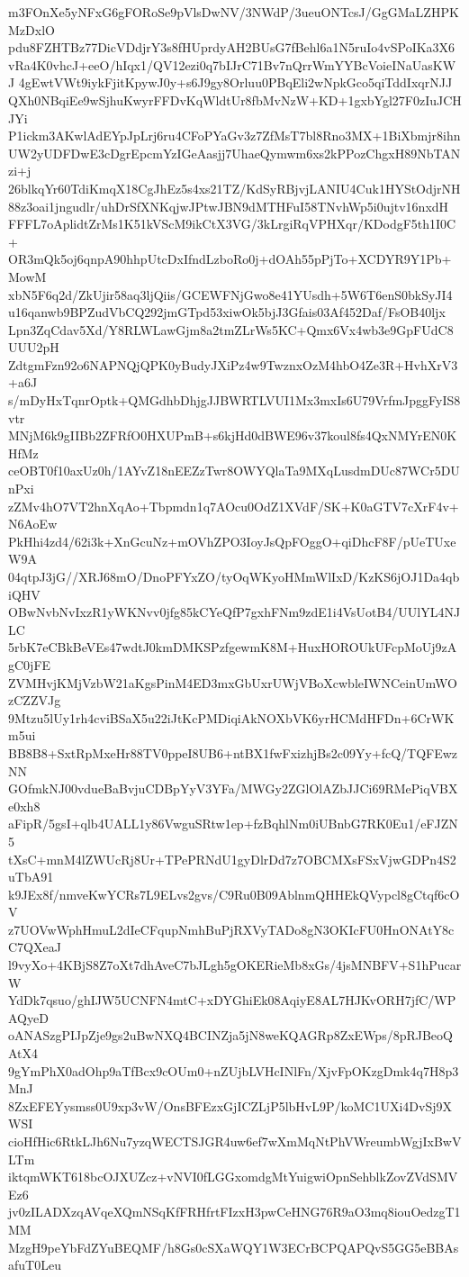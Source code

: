 m3FOnXe5yNFxG6gFORoSe9pVlsDwNV/3NWdP/3ueuONTcsJ/GgGMaLZHPKMzDxlO
pdu8FZHTBz77DicVDdjrY3s8fHUprdyAH2BUsG7fBehl6a1N5ruIo4vSPoIKa3X6
vRa4K0vhcJ+eeO/hIqx1/QV12ezi0q7bIJrC71Bv7nQrrWmYYBcVoieINaUasKWJ
4gEwtVWt9iykFjitKpywJ0y+s6J9gy8Orluu0PBqEli2wNpkGco5qiTddIxqrNJJ
QXh0NBqiEe9wSjhuKwyrFFDvKqWldtUr8fbMvNzW+KD+1gxbYgl27F0zIuJCHJYi
P1ickm3AKwlAdEYpJpLrj6ru4CFoPYaGv3z7ZfMsT7bl8Rno3MX+1BiXbmjr8ihn
UW2yUDFDwE3cDgrEpcmYzIGeAasjj7UhaeQymwm6xs2kPPozChgxH89NbTANzi+j
26blkqYr60TdiKmqX18CgJhEz5s4xs21TZ/KdSyRBjvjLANIU4Cuk1HYStOdjrNH
88z3oai1jngudlr/uhDrSfXNKqjwJPtwJBN9dMTHFuI58TNvhWp5i0ujtv16nxdH
FFFL7oAplidtZrMs1K51kVScM9ikCtX3VG/3kLrgiRqVPHXqr/KDodgF5th1I0C+
OR3mQk5oj6qnpA90hhpUtcDxIfndLzboRo0j+dOAh55pPjTo+XCDYR9Y1Pb+MowM
xbN5F6q2d/ZkUjir58aq3ljQiis/GCEWFNjGwo8e41YUsdh+5W6T6enS0bkSyJI4
u16qanwb9BPZudVbCQ292jmGTpd53xiwOk5bjJ3Gfais03Af452Daf/FsOB40ljx
Lpn3ZqCdav5Xd/Y8RLWLawGjm8a2tmZLrWs5KC+Qmx6Vx4wb3e9GpFUdC8UUU2pH
ZdtgmFzn92o6NAPNQjQPK0yBudyJXiPz4w9TwznxOzM4hbO4Ze3R+HvhXrV3+a6J
s/mDyHxTqnrOptk+QMGdhbDhjgJJBWRTLVUI1Mx3mxIs6U79VrfmJpggFyIS8vtr
MNjM6k9gIIBb2ZFRfO0HXUPmB+s6kjHd0dBWE96v37koul8fs4QxNMYrEN0KHfMz
ceOBT0f10axUz0h/1AYvZ18nEEZzTwr8OWYQlaTa9MXqLusdmDUc87WCr5DUnPxi
zZMv4hO7VT2hnXqAo+Tbpmdn1q7AOcu0OdZ1XVdF/SK+K0aGTV7cXrF4v+N6AoEw
PkHhi4zd4/62i3k+XnGcuNz+mOVhZPO3IoyJsQpFOggO+qiDhcF8F/pUeTUxeW9A
04qtpJ3jG//XRJ68mO/DnoPFYxZO/tyOqWKyoHMmWlIxD/KzKS6jOJ1Da4qbiQHV
OBwNvbNvIxzR1yWKNvv0jfg85kCYeQfP7gxhFNm9zdE1i4VsUotB4/UUlYL4NJLC
5rbK7eCBkBeVEs47wdtJ0kmDMKSPzfgewmK8M+HuxHOROUkUFcpMoUj9zAgC0jFE
ZVMHvjKMjVzbW21aKgsPinM4ED3mxGbUxrUWjVBoXcwbleIWNCeinUmWOzCZZVJg
9Mtzu5lUy1rh4cviBSaX5u22iJtKcPMDiqiAkNOXbVK6yrHCMdHFDn+6CrWKm5ui
BB8B8+SxtRpMxeHr88TV0ppeI8UB6+ntBX1fwFxizhjBs2c09Yy+fcQ/TQFEwzNN
GOfmkNJ00vdueBaBvjuCDBpYyV3YFa/MWGy2ZGlOlAZbJJCi69RMePiqVBXe0xh8
aFipR/5gsI+qlb4UALL1y86VwguSRtw1ep+fzBqhlNm0iUBnbG7RK0Eu1/eFJZN5
tXsC+mnM4lZWUcRj8Ur+TPePRNdU1gyDlrDd7z7OBCMXsFSxVjwGDPn4S2uTbA91
k9JEx8f/nmveKwYCRs7L9ELvs2gvs/C9Ru0B09AblnmQHHEkQVypcl8gCtqf6cOV
z7UOVwWphHmuL2dIeCFqupNmhBuPjRXVyTADo8gN3OKIcFU0HnONAtY8cC7QXeaJ
l9vyXo+4KBjS8Z7oXt7dhAveC7bJLgh5gOKERieMb8xGs/4jsMNBFV+S1hPucarW
YdDk7qsuo/ghIJW5UCNFN4mtC+xDYGhiEk08AqiyE8AL7HJKvORH7jfC/WPAQyeD
oANASzgPIJpZje9gs2uBwNXQ4BCINZja5jN8weKQAGRp8ZxEWps/8pRJBeoQAtX4
9gYmPhX0adOhp9aTfBcx9cOUm0+nZUjbLVHcINlFn/XjvFpOKzgDmk4q7H8p3MnJ
8ZxEFEYysmss0U9xp3vW/OnsBFEzxGjICZLjP5lbHvL9P/koMC1UXi4DvSj9XWSI
cioHfHic6RtkLJh6Nu7yzqWECTSJGR4uw6ef7wXmMqNtPhVWreumbWgjIxBwVLTm
iktqmWKT618bcOJXUZcz+vNVI0fLGGxomdgMtYuigwiOpnSehblkZovZVdSMVEz6
jv0zILADXzqAVqeXQmNSqKfFRHfrtFIzxH3pwCeHNG76R9aO3mq8iouOedzgT1MM
MzgH9peYbFdZYuBEQMF/h8Gs0cSXaWQY1W3ECrBCPQAPQvS5GG5eBBAsafuT0Leu
